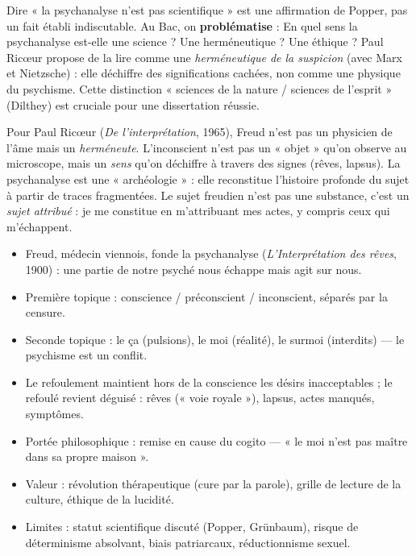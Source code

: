 \documentclass[11pt]{article}
\begin{document}
\begin{attention}
Dire « la psychanalyse n'est pas scientifique » est une affirmation de Popper, pas un fait établi indiscutable. Au Bac, on \textbf{problématise} : \og En quel sens la psychanalyse est-elle une science ? Une herméneutique ? Une éthique ? \fg{} Paul Ricœur propose de la lire comme une \emph{herméneutique de la suspicion} (avec Marx et Nietzsche) : elle déchiffre des significations cachées, non comme une physique du psychisme. Cette distinction « sciences de la nature / sciences de l'esprit » (Dilthey) est cruciale pour une dissertation réussie.
\end{attention}

\begin{savaistu}
Pour Paul Ricœur (\emph{De l'interprétation}, 1965), Freud n'est pas un physicien de l'âme mais un \emph{herméneute}. L'inconscient n'est pas un « objet » qu'on observe au microscope, mais un \emph{sens} qu'on déchiffre à travers des signes (rêves, lapsus). La psychanalyse est une « archéologie » : elle reconstitue l'histoire profonde du sujet à partir de traces fragmentées. Le sujet freudien n'est pas une substance, c'est un \emph{sujet attribué} : je me constitue en m'attribuant mes actes, y compris ceux qui m'échappent.
\end{savaistu}

\begin{aretenir}
\begin{itemize}
\item Freud, médecin viennois, fonde la psychanalyse (\emph{L'Interprétation des rêves}, 1900) : une partie de notre psyché nous échappe mais agit sur nous.
\item Première topique : conscience / préconscient / inconscient, séparés par la censure.
\item Seconde topique : le ça (pulsions), le moi (réalité), le surmoi (interdits) — le psychisme est un conflit.
\item Le refoulement maintient hors de la conscience les désirs inacceptables ; le refoulé revient déguisé : rêves (« voie royale »), lapsus, actes manqués, symptômes.
\item Portée philosophique : remise en cause du cogito — « le moi n'est pas maître dans sa propre maison ».
\item Valeur : révolution thérapeutique (cure par la parole), grille de lecture de la culture, éthique de la lucidité.
\item Limites : statut scientifique discuté (Popper, Grünbaum), risque de déterminisme absolvant, biais patriarcaux, réductionnisme sexuel.
\end{itemize}
\end{aretenir}
\end{document}

